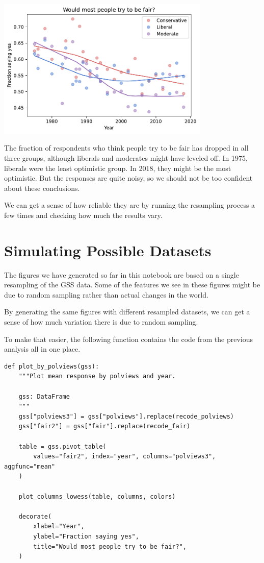 \begin{center}
\includegraphics[width=4in]{chapters/03_outlook_files/03_outlook_54_0.pdf}
\end{center}

The fraction of respondents who think people try to be fair has dropped
in all three groups, although liberals and moderates might have leveled
off. In 1975, liberals were the least optimistic group. In 2018, they
might be the most optimistic. But the responses are quite noisy, so we
should not be too confident about these conclusions.

We can get a sense of how reliable they are by running the resampling
process a few times and checking how much the results vary.

\hypertarget{simulating-possible-datasets}{%
\section{Simulating Possible
Datasets}\label{simulating-possible-datasets}}

The figures we have generated so far in this notebook are based on a
single resampling of the GSS data. Some of the features we see in these
figures might be due to random sampling rather than actual changes in
the world.

By generating the same figures with different resampled datasets, we can
get a sense of how much variation there is due to random sampling.

To make that easier, the following function contains the code from the
previous analysis all in one place.

\begin{lstlisting}[]
def plot_by_polviews(gss):
    """Plot mean response by polviews and year.

    gss: DataFrame
    """
    gss["polviews3"] = gss["polviews"].replace(recode_polviews)
    gss["fair2"] = gss["fair"].replace(recode_fair)

    table = gss.pivot_table(
        values="fair2", index="year", columns="polviews3", aggfunc="mean"
    )

    plot_columns_lowess(table, columns, colors)

    decorate(
        xlabel="Year",
        ylabel="Fraction saying yes",
        title="Would most people try to be fair?",
    )
\end{lstlisting}

